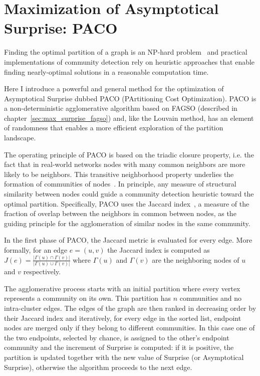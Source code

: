 \section{Maximization of Asymptotical Surprise: PACO}
Finding the optimal partition of a graph is an NP-hard problem~\cite{fortunato2010} and practical implementations of community detection rely on heuristic approaches that enable finding nearly-optimal solutions in a reasonable computation time.

Here I introduce a powerful and general method for the optimization of Asymptotical Surprise dubbed PACO (PArtitioning Cost Optimization).
PACO is a non-deterministic agglomerative algorithm based on FAGSO (described in chapter~\ref{sec:max_surprise_fagso}) and, like the Louvain method, has an element of randomness that enables a more efficient exploration of the partition landscape.

The operating principle of PACO is based on the triadic closure property, i.e. the fact that in real-world networks nodes with many common neighbors are more likely to be neighbors.
This transitive neighborhood property underlies the formation of communities of nodes~\cite{bianconi2014,eustace2015}.
In principle, any measure of structural similarity between nodes could guide a community detection heuristic toward the optimal partition.
Specifically, PACO uses the Jaccard index~\cite{jaccard1901}, a measure of the fraction of overlap between the neighbors in common between nodes, as the guiding principle for the agglomeration of similar nodes in the same community.

In the first phase of PACO, the Jaccard metric is evaluated for every edge. More formally, for an edge $e=(u,v)$ the Jaccard index is computed as $J(e)=\frac{|\Gamma(u) \cap \Gamma(v)|}{|\Gamma(u) \cup \Gamma(v)|}$ where $\Gamma(u)$ and $\Gamma(v)$ are the neighboring nodes of $u$ and $v$ respectively.

The agglomerative process starts with an initial partition where every vertex represents a community on its own.
This partition has $n$ communities and no intra-cluster edges.
The edges of the graph are then ranked in decreasing order by their Jaccard index and iteratively, for every edge in the sorted list, endpoint nodes are merged only if they belong to different communities.
In this case one of the two endpoints, selected by chance, is assigned to the other's endpoint community and the increment of Surprise is computed: if it is positive, the partition is updated together with the new value of Surprise (or Asymptotical Surprise), otherwise the algorithm proceeds to the next edge. 


